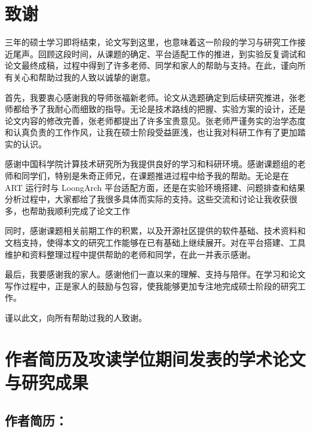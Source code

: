 \chapter[致谢]{致\quad 谢}%

三年的硕士学习即将结束，论文写到这里，也意味着这一阶段的学习与研究工作接近尾声。回顾这段时间，从课题的确定、平台适配工作的推进，到实验反复调试和论文最终成稿，过程中得到了许多老师、同学和家人的帮助与支持。在此，谨向所有关心和帮助过我的人致以诚挚的谢意。

首先，我要衷心感谢我的导师张福新老师。论文从选题确定到后续研究推进，张老师都给予了我耐心而细致的指导。无论是技术路线的把握、实验方案的设计，还是论文内容的修改完善，张老师都提出了许多宝贵意见。张老师严谨务实的治学态度和认真负责的工作作风，让我在硕士阶段受益匪浅，也让我对科研工作有了更加踏实的认识。

感谢中国科学院计算技术研究所为我提供良好的学习和科研环境。感谢课题组的老师和同学们，特别是朱奇正师兄，在课题推进过程中给予我的帮助。无论是在 ART 运行时与 LoongArch 平台适配方面，还是在实验环境搭建、问题排查和结果分析过程中，大家都给了我很多具体而实际的支持。这些交流和讨论让我收获很多，也帮助我顺利完成了论文工作

同时，感谢课题相关前期工作的积累，以及开源社区提供的软件基础、技术资料和文档支持，使得本文的研究工作能够在已有基础上继续展开。对在平台搭建、工具维护和资料整理过程中提供帮助的老师和同学，在此一并表示感谢。

最后，我要感谢我的家人。感谢他们一直以来的理解、支持与陪伴。在学习和论文写作过程中，正是家人的鼓励与包容，使我能够更加专注地完成硕士阶段的研究工作。

谨以此文，向所有帮助过我的人致谢。

\chapter{作者简历及攻读学位期间发表的学术论文与研究成果}

\section*{作者简历：}

